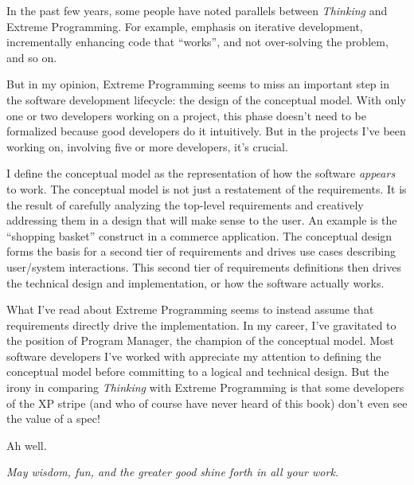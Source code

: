 In the past few years, some people have noted parallels between
\emph{Thinking \Forth{}} and Extreme Programming. For example, emphasis on
iterative development, incrementally enhancing code that ``works'', and
not over-solving the problem, and so on.

But in my opinion, Extreme Programming seems to miss an important step
in the software development lifecycle: the design of the conceptual
model. With only one or two developers working on a project, this
phase doesn't need to be formalized because good developers do it
intuitively. But in the projects I've been working on, involving five
or more developers, it's crucial.

I define the conceptual model as the representation of how the
software \emph{appears} to work. The conceptual model is not just a
restatement of the requirements. It is the result of carefully
analyzing the top-level requirements and creatively addressing them in
a design that will make sense to the user. An example is the ``shopping
basket'' construct in a commerce application. The conceptual design
forms the basis for a second tier of requirements and drives use cases
describing user/system interactions. This second tier of requirements
definitions then drives the technical design and implementation, or how
the software actually works.

What I've read about Extreme Programming seems to instead assume that
requirements directly drive the implementation. In my career, I've
gravitated to the position of Program Manager, the champion of the
conceptual model. Most software developers I've worked with appreciate
my attention to defining the conceptual model before committing to a
logical and technical design. But the irony in comparing \emph{Thinking
\Forth{}} with Extreme Programming is that some developers of the XP
stripe (and who of course have never heard of this book) don't even
see the value of a spec!

Ah well.

\begin{flushright}
\emph{May wisdom, fun, and the greater good shine forth in all your work.}

\vspace{2.5em}
\end{flushright}
